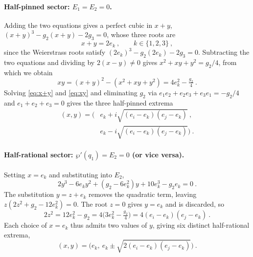 \documentclass[aps, prx, nofootinbib, twocolumn,amsfonts,amsmath,amssymb,mathtools,superscriptaddress,preprintnumbers,floatfix,reprint]{revtex4-2}
\begin{document}
\paragraph{Half-pinned sector: \texorpdfstring{$E_1=E_2=0$}{}.}
Adding the two equations gives a perfect cubic in $x+y$,
$(x+y)^3-g_2(x+y)-2g_3=0$, whose three roots are
\begin{equation}\label{eq:x+y}
  x+y=2e_k\ ,\qquad k\in\{1,2,3\}\ ,
\end{equation}
since the Weierstrass roots satisfy $(2e_k)^3-g_2(2e_k)-2g_3=0$. Subtracting
the two equations and dividing by $2(x-y)\neq0$ gives $x^2+xy+y^2=g_2/4$, from which we obtain
\begin{equation}\label{eq:xy}
  xy=(x+y)^2-(x^2+xy+y^2)=4e_k^2-\tfrac{g_2}{4}\ .
\end{equation}
Solving \eqref{eq:x+y} and \eqref{eq:xy} and eliminating $g_2$ via
$e_1e_2+e_2e_3+e_3e_1=-g_2/4$ and $e_1+e_2+e_3=0$ gives the three half-pinned
extrema
\begin{align}\label{eq:half-pinned}
  (x,y)=\Big(&e_k+i\sqrt{(e_i-e_k)(e_j-e_k)}\ ,\nonumber \\
  &e_k-i\sqrt{(e_i-e_k)(e_j-e_k)}\Big)\ .
\end{align}

\paragraph{Half-rational sector:
\texorpdfstring{$\wp'(q_1)=E_2=0$}{} (or vice versa).}
Setting $x=e_k$ and substituting into $E_2$,
\begin{equation}
  2y^3-6e_ky^2+(g_2-6e_k^2)y+10e_k^3-g_2e_k=0\ .
\end{equation}
The substitution $y=z+e_k$ removes the quadratic term, leaving
$z(2z^2+g_2-12e_k^2)=0$. The root $z=0$ gives $y=e_k$ and is discarded, so
\begin{equation}
  2z^2=12e_k^2-g_2=4\Big(3e_k^2-\tfrac{g_2}{4}\Big)=4(e_i-e_k)(e_j-e_k)\ .
\end{equation}
Each choice of $x=e_k$ thus admits two values of $y$, giving six distinct
half-rational extrema,
\begin{equation}\label{eq:half-rational}
  (x,y)=\Big(e_k,\ e_k\pm\sqrt{2(e_i-e_k)(e_j-e_k)}\Big)\ .
\end{equation}
\end{document}
